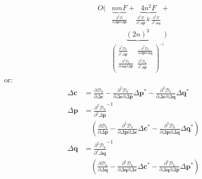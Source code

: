 \begin{equation}
    \begin{aligned}
        O( &
        \underbrace{nmF}_{\frac{\partial^2\mathcal{D}}{\partial\Delta\mathbf{p}\partial\Delta\mathbf{p}}}
        +
        \underbrace{4n^2F}_{\frac{\partial^2\mathcal{D}}{\partial^2\Delta\mathbf{p}} \, \& \, \frac{\partial^2\mathcal{D}}{\partial^2\Delta\mathbf{q}}}
        +
        \\
        &
        \underbrace{(2n)^3}_{
        \begin{pmatrix}
            \frac{\partial^2 \mathcal{D}_b}{\partial^2 \Delta \mathbf{p}} & \frac{\partial^2 \mathcal{D}_b}{\partial \Delta \mathbf{p} \partial \Delta \mathbf{q}}
            \\
            \frac{\partial^2 \mathcal{D}_b}{\partial \Delta \mathbf{q} \partial \Delta \mathbf{p}} & \frac{\partial^2 \mathcal{D}_b}{\partial^2 \Delta \mathbf{p}}
            \\
        \end{pmatrix}^{-1}}
        )
    \label{eq:complexity_alt_bidirectional1_newton}
    \end{aligned}
\end{equation}
or:
\begin{equation}
    \begin{aligned}
        \Delta \mathbf{c} & =  \frac{\partial \mathcal{D}_b}{\partial \Delta \mathbf{c}} - \frac{\partial^2 \mathcal{D}_b}{\partial \Delta \mathbf{c} \partial \Delta \mathbf{p}} \Delta \mathbf{p}^* - \frac{\partial^2 \mathcal{D}_b}{\partial \Delta \mathbf{c} \partial \Delta \mathbf{q}} \Delta \mathbf{q}^*
        \\
        \Delta \mathbf{p} & = \frac{\partial^2 \mathcal{D}_b}{\partial^2 \Delta \mathbf{p}}^{-1}
        \\
        & \quad \left( \frac{\partial \mathcal{D}_b}{\partial \Delta \mathbf{p}} - \frac{\partial^2 \mathcal{D}_b}{\partial \Delta \mathbf{p} \partial \Delta \mathbf{c}} \Delta \mathbf{c}^* - \frac{\partial^2 \mathcal{D}_b}{\partial \Delta \mathbf{p} \partial \Delta \mathbf{q}} \Delta \mathbf{q}^* \right)
        \\
        \Delta \mathbf{q} & = \frac{\partial^2 \mathcal{D}_b}{\partial^2 \Delta \mathbf{q}}^{-1}
        \\
        & \quad \left( \frac{\partial \mathcal{D}_b}{\partial \Delta \mathbf{q}} - \frac{\partial^2 \mathcal{D}_b}{\partial \Delta \mathbf{q} \partial \Delta \mathbf{c}} \Delta \mathbf{c}^* - \frac{\partial^2 \mathcal{D}_b}{\partial \Delta \mathbf{q} \partial \Delta \mathbf{p}} \Delta \mathbf{p}^* \right)
        \label{eq:bidirectional_newton_alternated_solution2}
    \end{aligned}
\end{equation}
